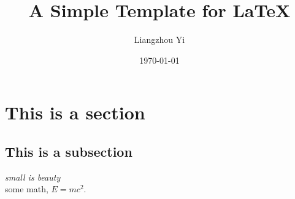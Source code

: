 \documentclass[11pt]{article}
\title{A Simple Template for \LaTeX}
\author{Liangzhou Yi}
\date{\today}
\begin{document}
\maketitle  %
\section{This is a section}
\subsection{This is a subsection}
\emph{small is beauty} \\ 
some math, $E = mc^{2}$. \\
\end{document}
